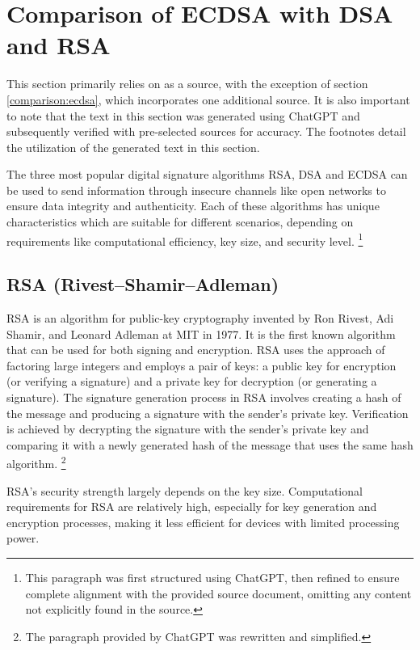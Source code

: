 \section{Comparison of ECDSA with DSA and RSA}


This section primarily relies on \cite{Xuan2009} as a source, with the exception of section \ref{comparison:ecdsa}, which incorporates one additional source. It is also important to note that the text in this section was generated using ChatGPT and subsequently verified with pre-selected sources for accuracy. The footnotes detail the utilization of the generated text in this section.

The three most popular digital signature algorithms RSA, DSA and ECDSA can be used to send information through insecure channels like open networks to ensure data integrity and authenticity. Each of these algorithms has unique characteristics which are suitable for different scenarios, depending on requirements like computational efficiency, key size, and security level. \footnote{This paragraph was first structured using ChatGPT, then refined to ensure complete alignment with the provided source document, omitting any content not explicitly found in the source.}

\subsection{RSA (Rivest–Shamir–Adleman)}

RSA is an algorithm for public-key cryptography invented by Ron Rivest, Adi Shamir, and Leonard Adleman at MIT in 1977. It is the first known algorithm that can be used for both signing and encryption. RSA uses the approach of factoring large integers and employs a pair of keys: a public key for encryption (or verifying a signature) and a private key for decryption (or generating a signature). The signature generation process in RSA involves creating a hash of the message and producing a signature with the sender’s private key. Verification is achieved by decrypting the signature with the sender's private key and comparing it with a newly generated hash of the message that uses the same hash algorithm. \footnote{The paragraph provided by ChatGPT was rewritten and simplified.}

RSA's security strength largely depends on the key size. Computational requirements for RSA are relatively high, especially for key generation and encryption processes, making it less efficient for devices
with limited processing power.

